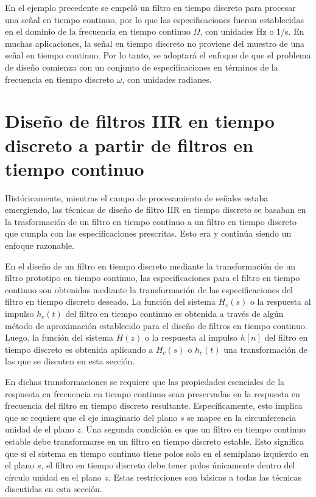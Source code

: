 \documentclass[a4paper]{report}
\begin{document}
En el ejemplo precedente se empeló un filtro en tiempo discreto para procesar una señal en tiempo continuo, por lo que las especificaciones fueron establecidas en el dominio de la frecuencia en tiempo continuo \(\Omega\), con unidades Hz o 1/s. En muchas aplicaciones, la señal en tiempo discreto no proviene del muestro de una señal en tiempo continuo. Por lo tanto, se adoptará el enfoque de que el problema de diseño comienza con un conjunto de especificaciones en términos de la frecuencia en tiempo discreto \(\omega\), con unidades radianes.

\section{Diseño de filtros IIR en tiempo discreto a partir de filtros en tiempo continuo}

Históricamente, mientras el campo de procesamiento de señales estaba emergiendo, las técnicas de diseño de filtro IIR en tiempo discreto se basaban en la trasformación de un filtro en tiempo continuo a un filtro en tiempo discreto que cumpla con las especificaciones prescritas. Esto era y continúa siendo un enfoque razonable.

En el diseño de un filtro en tiempo discreto mediante la transformación de un filtro prototipo en tiempo continuo, las especificaciones para el filtro en tiempo continuo son obtenidas mediante la transformación de las especificaciones del filtro en tiempo discreto deseado. La función del sistema \(H_c(s)\) o la respuesta al impulso \(h_c(t)\) del filtro en tiempo continuo es obtenida a través de algún método de aproximación establecido para el diseño de filtros en tiempo continuo. Luego, la función del sistema \(H(z)\) o la respuesta al impulso \(h[n]\) del filtro en tiempo discreto es obtenida aplicando a \(H_c(s)\) o \(h_c(t)\) una transformación de las que se discuten en esta sección.

En dichas transformaciones se requiere que las propiedades esenciales de la respuesta en frecuencia en tiempo continuo sean preservadas en la respuesta en frecuencia del filtro en tiempo discreto resultante. Específicamente, esto implica que se requiere que el eje imaginario del plano \(s\) se mapee en la circunferencia unidad de el plano \(z\). Una segunda condición es que un filtro en tiempo continuo estable debe transformarse en un filtro en tiempo discreto estable. Esto significa que si el sistema en tiempo continuo tiene polos solo en el semiplano izquierdo en el plano \(s\), el filtro en  tiempo discreto debe tener polos únicamente dentro del círculo unidad en el plano \(z\). Estas restricciones son básicas a todas las técnicas discutidas en esta sección.
\end{document}
